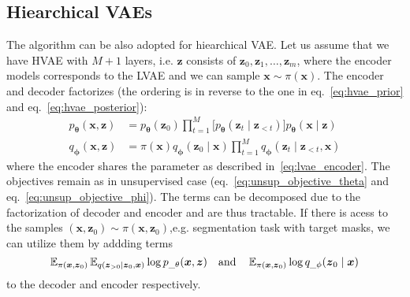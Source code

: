 \subsection{Hiearchical VAEs}
The algorithm can be also adopted for hiearchical VAE. Let us assume that we have HVAE with $M+1$ layers, i.e. $\boldsymbol{z}$ consists of 
$\boldsymbol{z}_0,\boldsymbol{z}_1,\dots,\boldsymbol{z}_m$, where the encoder models corresponds to the LVAE and we can sample $\boldsymbol{x} \sim \pi(\boldsymbol{x})$.
The encoder and decoder factorizes (the ordering is in reverse to the one in eq.~\ref{eq:hvae_prior} and eq.~\ref{eq:hvae_posterior}):
\begin{align*}
    p_{\boldsymbol{\theta}}(\boldsymbol{x},\boldsymbol{z})&=p_{\boldsymbol{\theta}}(\boldsymbol{z}_{0}) \prod_{t=1}^{M}\bigl[p_{\boldsymbol{\theta}}(\boldsymbol{z}_{t}\mid\boldsymbol{z}_{<t}) \bigr]  p_{\boldsymbol{\theta}}(\boldsymbol{x}\mid\boldsymbol{z})  \\
    q_{\boldsymbol{\phi}}(\boldsymbol{x},\boldsymbol{z}) &=\pi(\boldsymbol{x})q_{\boldsymbol{\phi}}(\boldsymbol{z}_{0}\mid\boldsymbol{x}) \prod_{t=1}^{M}  q_{\boldsymbol{\phi}}(\boldsymbol{z}_{t}\mid\boldsymbol{z}_{<t},\boldsymbol{x}) 
\end{align*}
where the encoder shares the parameter as described in~\ref{eq:lvae_encoder}. The objectives remain as in unsupervised case (eq.~\ref{eq:unsup_objective_theta} and eq.~\ref{eq:unsup_objective_phi}).
The terms can be decomposed due to the factorization of decoder and encoder and are thus tractable.  If there is 
acess to the samples $(\boldsymbol{x},\boldsymbol{z}_0) \sim \pi(\boldsymbol{x},\boldsymbol{z}_0)$,e.g. segmentation task with target masks, we can utilize them 
by addding terms
$$
\operatorname{\mathbb{E}}_{\pi(\boldsymbol{x},\boldsymbol{z}_0)}\operatorname{\mathbb{E}}_{q(\boldsymbol{z}_{>0} \mid\boldsymbol{z}_0,\boldsymbol{x})} \log p_{\_\theta}(\boldsymbol{x},\boldsymbol{z}) 
\quad\text{and}\quad
\operatorname{\mathbb{E}}_{\pi(\boldsymbol{x},\boldsymbol{z}_0)} \log q_{\_\phi}(\boldsymbol{z}_0\mid\boldsymbol{x})
$$
to the decoder and encoder respectively. 








